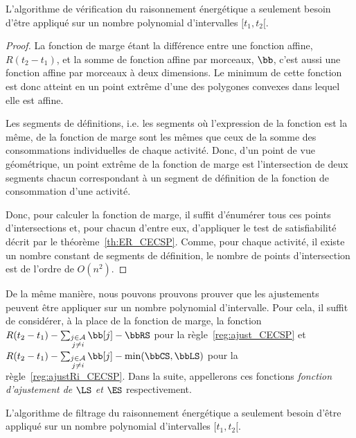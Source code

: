 \begin{theo}
  L'algorithme de vérification du raisonnement énergétique a seulement
  besoin d'être appliqué sur un nombre polynomial d'intervalles $[t_1,t_2[$.
\end{theo}

\begin{proof}
  La fonction de marge étant la différence entre une fonction affine,
  $R(t_2-t_1)$, et la somme de fonction affine par morceaux,
  $\bb$, c'est aussi une fonction affine par morceaux à deux
  dimensions. Le minimum de cette fonction est donc atteint en un point
  extrême d'une des polygones convexes dans lequel elle est
  affine. 

  Les segments de définitions, i.e. les segments où l'expression de la
  fonction est la même, de la fonction de marge sont les mêmes que ceux
  de la somme des consommations individuelles de chaque activité. Donc,
  d'un point de vue géométrique, un point extrême de la fonction de marge
  est l'intersection de deux segments chacun correspondant à un segment
  de définition de la fonction de consommation d'une activité. 

  Donc, pour calculer la fonction de marge, il suffit d'énumérer tous
  ces points d'intersections et, pour chacun d'entre eux, d'appliquer le
  test de satisfiabilité décrit par le
  théorème~\ref{th:ER_CECSP}. Comme, pour chaque activité, il existe un
  nombre constant de segments de définition, le nombre de points
  d'intersection est de l'ordre de $O(n^2)$.
\end{proof}

De la même manière, nous pouvons prouvons prouver que les ajustements
peuvent être appliquer sur un nombre polynomial d'intervalle. Pour
cela, il suffit de considérer, à la place de la fonction de marge, la
fonction $ R(t_2-t_1) - \sum_{\substack{j \in \A\\ j \neq i}} \bb[j] -
\bbRS$ pour la règle~\ref{reg:ajust_CECSP} et $ R(t_2-t_1) - \sum_{\substack{j \in
\A\\ j \neq i}} \bb[j] - \min(\bbCS,\bbLS)$ pour la
règle~\ref{reg:ajustRi_CECSP}. Dans la suite, appellerons ces
fonctions {\it fonction d'ajustement de $\LS$ et $\ES$} respectivement. 

\begin{theo}
  L'algorithme de filtrage du raisonnement énergétique a seulement
  besoin d'être appliqué sur un nombre polynomial d'intervalles $[t_1,t_2[$.
\end{theo}

